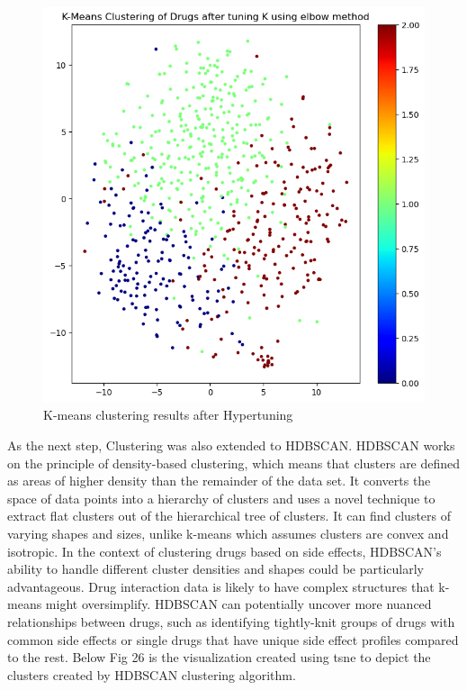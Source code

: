 \documentclass[journal,transmag]{J-NaNA}
\begin{document}
\begin{figure}[htbp]
\centering
\includegraphics[width=\linewidth]{k-means-after-k.png} 
\caption{K-means clustering results after Hypertuning} 
\label{fig: K-means after setting the optimal k} %
\end{figure}
As the next step, Clustering was also extended to HDBSCAN. HDBSCAN works on the principle of density-based clustering, which means that clusters are defined as areas of higher density than the remainder of the data set. It converts the space of data points into a hierarchy of clusters and uses a novel technique to extract flat clusters out of the hierarchical tree of clusters. It can find clusters of varying shapes and sizes, unlike k-means which assumes clusters are convex and isotropic. In the context of clustering drugs based on side effects, HDBSCAN's ability to handle different cluster densities and shapes could be particularly advantageous. Drug interaction data is likely to have complex structures that k-means might oversimplify. HDBSCAN can potentially uncover more nuanced relationships between drugs, such as identifying tightly-knit groups of drugs with common side effects or single drugs that have unique side effect profiles compared to the rest. Below Fig 26 is the visualization created using tsne to depict the clusters created by HDBSCAN clustering algorithm. 
\end{document}
